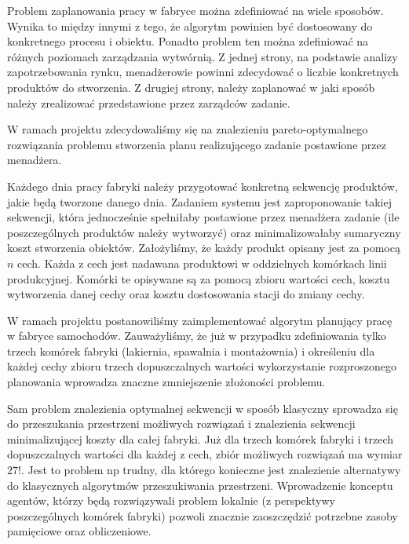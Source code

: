 Problem zaplanowania pracy w fabryce można zdefiniować na wiele sposobów. Wynika to między innymi z tego, że algorytm powinien być dostosowany do konkretnego procesu i obiektu. Ponadto problem ten można zdefiniować na różnych poziomach zarządzania wytwórnią. Z jednej strony, na podstawie analizy zapotrzebowania rynku, menadżerowie powinni zdecydować o liczbie konkretnych produktów do stworzenia. Z drugiej strony, należy zaplanować w jaki sposób należy zrealizować przedstawione przez zarządców zadanie.

W ramach projektu zdecydowaliśmy się na znalezieniu pareto-optymalnego rozwiązania problemu stworzenia planu realizującego zadanie postawione przez menadżera. 

Każdego dnia pracy fabryki należy przygotować konkretną sekwencję produktów, jakie będą tworzone danego dnia. Zadaniem systemu jest zaproponowanie takiej sekwencji, która jednocześnie spełniłaby postawione przez menadżera zadanie (ile poszczególnych produktów należy wytworzyć) oraz minimalizowałaby sumaryczny koszt stworzenia obiektów. Założyliśmy, że każdy produkt opisany jest za pomocą $n$ cech. Każda z cech jest nadawana produktowi w oddzielnych komórkach linii produkcyjnej. Komórki te opisywane są za pomocą zbioru wartości cech, kosztu wytworzenia danej cechy oraz kosztu dostosowania stacji do zmiany cechy.

W ramach projektu postanowiliśmy zaimplementować algorytm planujący pracę w fabryce samochodów. Zauważyliśmy, że już w przypadku zdefiniowania tylko trzech komórek fabryki (lakiernia, spawalnia i montażownia) i określeniu dla każdej cechy zbioru trzech dopuszczalnych wartości wykorzystanie rozproszonego planowania wprowadza znaczne zmniejszenie złożoności problemu. 

Sam problem znalezienia optymalnej sekwencji w sposób klasyczny sprowadza się do przeszukania przestrzeni możliwych rozwiązań i znalezienia sekwencji minimalizującej koszty dla całej fabryki. Już dla trzech komórek fabryki i trzech dopuszczalnych wartości dla każdej z cech, zbiór możliwych rozwiązań ma wymiar $27!$. Jest to problem np trudny, dla którego konieczne jest znalezienie alternatywy do klasycznych algorytmów przeszukiwania przestrzeni. Wprowadzenie konceptu agentów, którzy będą rozwiązywali problem lokalnie (z perspektywy poszczególnych komórek fabryki) pozwoli znacznie zaoszczędzić potrzebne zasoby pamięciowe oraz obliczeniowe.